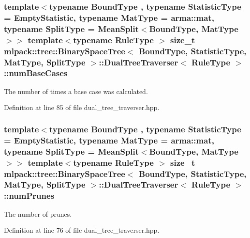\subsubsection[{num\-Base\-Cases}]{\setlength{\rightskip}{0pt plus 5cm}template$<$typename Bound\-Type , typename Statistic\-Type  = Empty\-Statistic, typename Mat\-Type  = arma\-::mat, typename Split\-Type  = Mean\-Split$<$\-Bound\-Type, Mat\-Type$>$$>$ template$<$typename Rule\-Type $>$ size\-\_\-t {\bf mlpack\-::tree\-::\-Binary\-Space\-Tree}$<$ Bound\-Type, Statistic\-Type, Mat\-Type, Split\-Type $>$\-::{\bf Dual\-Tree\-Traverser}$<$ Rule\-Type $>$\-::num\-Base\-Cases\hspace{0.3cm}{\ttfamily [private]}}\label{classmlpack_1_1tree_1_1BinarySpaceTree_1_1DualTreeTraverser_a271ee1191ed2dc57e8a7c5b68bd8cd41}


The number of times a base case was calculated. 



Definition at line 85 of file dual\-\_\-tree\-\_\-traverser.\-hpp.

\subsubsection[{num\-Prunes}]{\setlength{\rightskip}{0pt plus 5cm}template$<$typename Bound\-Type , typename Statistic\-Type  = Empty\-Statistic, typename Mat\-Type  = arma\-::mat, typename Split\-Type  = Mean\-Split$<$\-Bound\-Type, Mat\-Type$>$$>$ template$<$typename Rule\-Type $>$ size\-\_\-t {\bf mlpack\-::tree\-::\-Binary\-Space\-Tree}$<$ Bound\-Type, Statistic\-Type, Mat\-Type, Split\-Type $>$\-::{\bf Dual\-Tree\-Traverser}$<$ Rule\-Type $>$\-::num\-Prunes\hspace{0.3cm}{\ttfamily [private]}}\label{classmlpack_1_1tree_1_1BinarySpaceTree_1_1DualTreeTraverser_ac154da7a7213d0477f7b9259818f7392}


The number of prunes. 



Definition at line 76 of file dual\-\_\-tree\-\_\-traverser.\-hpp.

